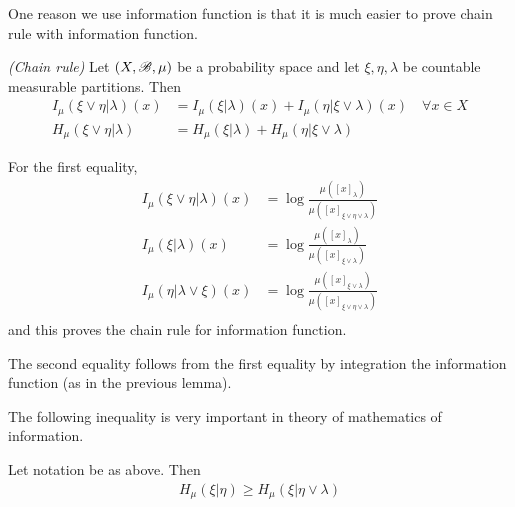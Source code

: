\documentclass[12pt,a4paper]{report}
\newenvironment{proof}
{\begin{changemargin}{1cm}{0.5cm} 
	}%
	{\end{changemargin}
}
\begin{document}
One reason we use information function is that it is much easier to prove chain rule with information function.
\s

\lem \emph{(Chain rule)} Let $(X,\mathscr{B}, \mu)$ be a probability space and let $\xi, \eta, \lambda$ be countable measurable partitions. Then
\begin{align*}
I_{\mu} (\xi \vee \eta | \lambda)(x) &= I_{\mu}(\xi | \lambda) (x) + I_{\mu}(\eta | \xi \vee \lambda)(x) \quad \forall x \in X \\
H_{\mu} (\xi \vee \eta | \lambda) &= H_{\mu}(\xi | \lambda)  + H_{\mu}(\eta | \xi \vee \lambda)
\end{align*}
\begin{proof}
\pf For the first equality,
\begin{align*}
I_{\mu} (\xi \vee \eta |\lambda) (x)  &= \log \frac{\mu ([x]_{\lambda})}{\mu([x]_{\xi \vee \eta \vee \lambda})} \\
I_{\mu} (\xi |\lambda) (x)  &= \log \frac{\mu ([x]_{\lambda})}{\mu([x]_{\xi \vee \lambda})} \\
I_{\mu} (\eta |\lambda \vee \xi) (x)  &= \log \frac{\mu ([x]_{\xi \vee \lambda})}{\mu([x]_{\xi \vee \eta \vee \lambda})} \\
\end{align*}
and this proves the chain rule for information function.

\quad The second equality follows from the first equality by integration the information function (as in the previous lemma).

\eop
\end{proof}
\s

The following inequality is very important in theory of mathematics of information.
\s

\lem Let notation be as above. Then
\begin{align*}
H_{\mu}(\xi | \eta) \geq H_{\mu}(\xi | \eta \vee \lambda)
\end{align*}
\end{document}
